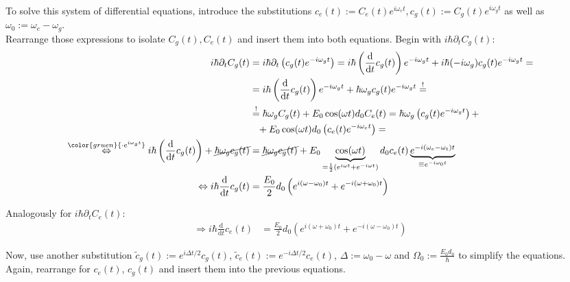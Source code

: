 \documentclass{article}
\newcommand{\diff}{\mathrm{d}}
\newcommand{\lr}[1]{\left(#1\right)}
\newcommand{\comment}[1]{{\color{gruen} {#1}}}
\begin{document}
{	To solve this system of differential equations, introduce the substitutions $c_e(t) := C_e(t) e^{i\omega_e t}, c_g(t) := C_g(t) e^{i\omega_g t}$ as well as $\omega_0 := \omega_e - \omega_g$.\\
	Rearrange those expressions to isolate $C_g(t), C_e(t)$ and insert them into both equations. Begin with $i\hbar \partial_t C_g(t)$:
		\begin{align*}
			i\hbar \partial_t C_g(t) &= i\hbar \partial_t \lr{ c_g(t) e^{-i\omega_g t} } = i\hbar \lr{ \frac{\diff}{\diff t} c_g(t) } e^{-i\omega_g t} + i\hbar(-i\omega_g) c_g(t) e^{-i\omega_g t} = \\
			&= i\hbar \lr{ \frac{\diff}{\diff t} c_g(t) } e^{-i\omega_g t} + \hbar\omega_g c_g(t) e^{-i\omega_g t} \stackrel{!}{=} \\
			&\stackrel{!}{=} \hbar\omega_g C_g(t) + E_0 \cos(\omega t) d_0 C_e(t) = \hbar\omega_g \lr{ c_g(t) e^{-i\omega_g t} } + \\
			&\phantom{=} + E_0 \cos(\omega t) d_0 \lr{ c_e(t) e^{-i\omega_e t} } = \\
			\stackrel{\comment{\cdot e^{i\omega_g t}}}{\Leftrightarrow} i\hbar \lr{ \frac{\diff}{\diff t} c_g(t) } + \cancel{ \hbar\omega_g c_g(t) } &= \cancel{ \hbar\omega_g c_g(t) } + E_0 \underbrace{ \cos(\omega t) }_{=\frac{1}{2} \lr{ e^{i\omega t} + e^{-i\omega t} } } d_0 c_e(t) \underbrace{ e^{-i(\omega_e - \omega_t)t} }_{\equiv e^{-i\omega_0 t}} \\
			\Leftrightarrow i\hbar \frac{\diff}{\diff t} c_g(t) &= \frac{E_0}{2} d_0 \lr{ e^{i(\omega - \omega_0)t} + e^{-i(\omega + \omega_0)t} }
		\end{align*}

	Analogously for $i\hbar\partial_t C_e(t)$:
		\begin{align*}
			\Rightarrow i\hbar \frac{\diff}{\diff t} c_e(t) &= \frac{E_0}{2}d_0 \lr{ e^{i(\omega + \omega_0)t} + e^{-i(\omega - \omega_0)t} }
		\end{align*}
	
	Now, use another substitution $\tilde{c}_g(t) := e^{i\Delta t/2} c_g(t)$, $\tilde{c}_e(t) := e^{-i\Delta t/2} c_e(t)$, $\Delta := \omega_0 - \omega$ and $\Omega_0 := \frac{E_0d_0}{\hbar}$ to simplify the equations. Again, rearrange for $c_e(t)$, $c_g(t)$ and insert them into the previous equations.
	

\newpage
	
}
\end{document}
